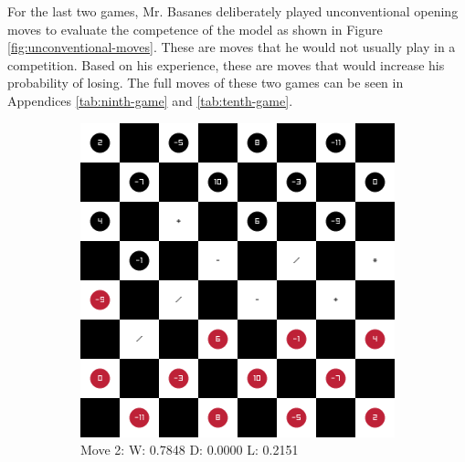 For the last two games, Mr. Basanes deliberately played unconventional opening moves to evaluate the competence of the model as shown in Figure \ref{fig:unconventional-moves}.  These are moves that he would not usually play in a competition. Based on his experience, these are moves that would increase his probability of losing. The full moves of these two games can be seen in Appendices \ref{tab:ninth-game} and \ref{tab:tenth-game}.

\begin{figure}[H]
  \centering
  \begin{subfigure}{0.4\textwidth}
        \centering
        \includegraphics[width=\textwidth]{images/games/game9/move_2.png}
        \caption*{Move 2: W: 0.7848 D: 0.0000 L: 0.2151}
    \end{subfigure}
    \quad
    \begin{subfigure}{0.4\textwidth}
        \centering

\end{subfigure}
\end{figure}
